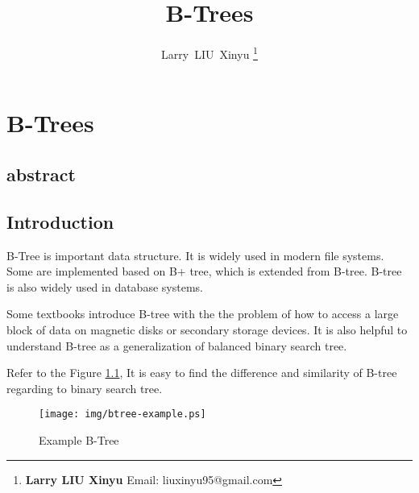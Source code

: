 \documentclass{article}
\begin{document}
\fi


\title{B-Trees}

\author{Larry~LIU~Xinyu
\thanks{{\bfseries Larry LIU Xinyu } \newline
  Email: liuxinyu95@gmail.com \newline}
  }


\maketitle

\ifx\wholebook\relax
\chapter{B-Trees}
\section{abstract}
\fi


\section{Introduction}
\label{introduction}

B-Tree is important data structure.
It is widely used in modern file systems. Some
are implemented based on B+ tree, which is extended from B-tree.
B-tree is also widely used in database systems.

Some textbooks introduce B-tree with the the problem of how to access a
large block of data on magnetic disks or secondary storage devices\cite{CLRS}.
It is also helpful to understand B-tree as a generalization of balanced binary
search tree\cite{wiki-b-tree}.

Refer to the Figure \ref{fig:btree-example}, It is easy to find the difference
and similarity of B-tree regarding to binary search tree.

\begin{figure}[htbp]
   \begin{center}
	\texttt{[image: img/btree-example.ps]}
   \caption{Example B-Tree} \label{fig:btree-example}
   \end{center}
\end{figure}
\end{document}
